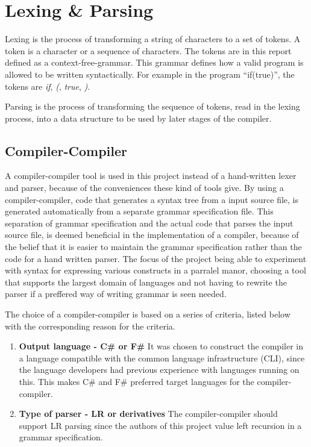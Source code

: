 \section{Lexing \& Parsing}
\label{sec:lexing/parsing}

Lexing is the process of transforming a string of characters to a set of tokens. A token is a character or a sequence of characters. The tokens are in this report defined as a context-free-grammar. This grammar defines how a valid program is allowed to be written syntactically. For example in the program \enquote{if(true)}, the tokens are \emph{if}, \emph{(}, \emph{true}, \emph{)}.

Parsing is the process of transforming the sequence of tokens, read in the lexing process, into a data structure to be used by later stages of the compiler.

\subsection{Compiler-Compiler}
\label{sec:compiler_compiler_choice}

A compiler-compiler tool is used in this project instead of a hand-written lexer and parser, because of the conveniences these kind of tools give. By using a compiler-compiler, code that generates a syntax tree from a input source file, is generated automatically from a separate grammar specification file. This separation of grammar specification and the actual code that parses the input source file, is deemed beneficial in the implementation of a compiler, because of the belief that it is easier to maintain the grammar specification rather than the code for a hand written parser. The focus of the project being able to experiment with syntax for expressing various constructs in a parralel manor, choosing a tool that supports the largest domain of languages and not having to rewrite the parser if a preffered way of writing grammar is seen needed.

The choice of a compiler-compiler is based on a series of criteria, listed below with the corresponding reason for the criteria.

\begin{enumerate}
\item \textbf{Output language - C\# or F\#} It was chosen to construct the compiler in a language compatible with the common language infrastructure (CLI), since the language developers had previous experience with languages running on this. This makes C\# and F\# preferred target languages for the compiler-compiler.

\item \textbf{Type of parser - LR or derivatives} The compiler-compiler should support LR parsing since the authors of this project value left recursion in a grammar specification.\\

\end{enumerate}

